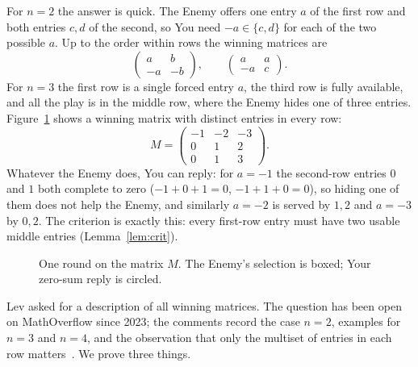 \documentclass[11pt]{article}
\theoremstyle{definition}
\theoremstyle{remark}
\begin{document}
For $n=2$ the answer is quick. The Enemy offers one entry $a$ of the first row and both entries $c,d$ of the second, so You need $-a\in\{c,d\}$ for each of the two possible $a$. Up to the order within rows the winning matrices are
\[
\begin{pmatrix} a & b\\ -a & -b\end{pmatrix},\qquad
\begin{pmatrix} a & a\\ -a & c\end{pmatrix}.
\]
For $n=3$ the first row is a single forced entry $a$, the third row is fully available, and all the play is in the middle row, where the Enemy hides one of three entries. Figure~\ref{fig:play} shows a winning matrix with distinct entries in every row:
\[
M=\begin{pmatrix}-1&-2&-3\\ 0&1&2\\ 0&1&3\end{pmatrix}.
\]
Whatever the Enemy does, You can reply: for $a=-1$ the second-row entries $0$ and $1$ both complete to zero ($-1+0+1=0$, $-1+1+0=0$), so hiding one of them does not help the Enemy, and similarly $a=-2$ is served by $1,2$ and $a=-3$ by $0,2$. The criterion is exactly this: every first-row entry must have two usable middle entries (Lemma~\ref{lem:crit}).

\begin{figure}[ht]
\centering
{}
\caption{One round on the matrix $M$. The Enemy's selection is boxed; Your zero-sum reply is circled.}
\label{fig:play}
\end{figure}

Lev asked for a description of all winning matrices. The question has been open on MathOverflow since 2023; the comments record the case $n=2$, examples for $n=3$ and $n=4$, and the observation that only the multiset of entries in each row matters~\cite{MO}. We prove three things.
\end{document}
